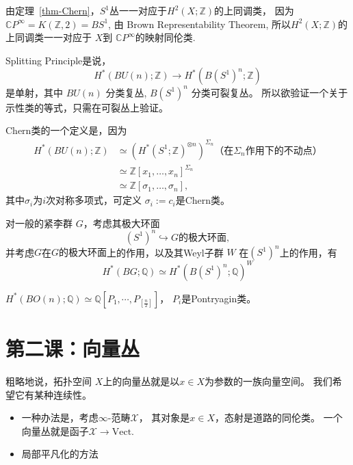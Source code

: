 \begin{example}
    由定理~\ref{thm-Chern}，$S^1$丛一一对应于$H^2(X;\mathbb{Z})$的上同调类，
    因为 $\mathbb{C}P^\infty=K(\mathbb{Z},2)=BS^1$, 由 Brown Representability Theorem, 
    所以$H^2(X;\mathbb{Z})$的上同调类一一对应于 $X$到 $\mathbb{C}P^\infty$的映射同伦类.

    Splitting Principle是说，
    $$
        H^*(BU(n);\mathbb{Z})\rightarrow H^*(B(S^1)^n;\mathbb{Z})
    $$
    是单射，其中 $BU(n)$ 分类复丛, $B(S^1)^n$ 分类可裂复丛。
    所以欲验证一个关于示性类的等式，只需在可裂丛上验证。

    \qquad Chern类的一个定义是，因为
    $$
        \begin{aligned}
            H^{*}(BU(n);\mathbb{Z}) & \simeq \left( H^*(S^1;\mathbb{Z})^{\otimes n} \right)^{\Sigma_n}
             \text{（在}\Sigma_n\text{作用下的不动点）}\\
            & \simeq \mathbb{Z}[x_1,\ldots , x_n]^{\Sigma_n} \\
            & \simeq \mathbb{Z}[\sigma_1,\ldots , \sigma_n],
        \end{aligned}
    $$
    其中$\sigma_i$为$i$次对称多项式，可定义 $\sigma_i:=c_i$是Chern类。

    \qquad 对一般的紧李群 $G$，考虑其极大环面
    $$
        (S^1)^n\hookrightarrow G\text{的极大环面},
    $$
    并考虑$G$在$G\text{的极大环面}$上的作用，以及其Weyl子群 $W$ 在$(S^1)^n$上的作用，有
    $$
        H^*(BG;\mathbb{Q})\simeq H^*(B(S^1)^n;\mathbb{Q})^{W}
    $$
\end{example}

\begin{example}
    $H^*(BO(n);\mathbb{Q})\simeq \mathbb{Q}[P_1,\cdots,P_{[\frac{n}{2}]}]$，
    $P_i$是Pontryagin类。
\end{example}

\section{第二课：向量丛}
    \qquad 粗略地说，拓扑空间 $X$上的向量丛就是以$x\in X$为参数的一族向量空间。
    我们希望它有某种连续性。
    \begin{itemize}
        \item 一种办法是，考虑$\infty$-范畴$\mathscr{X}$，
        其对象是$x\in X$，态射是道路的同伦类。
        一个向量丛就是函子$\mathscr{X}\rightarrow \mathrm{Vect}$.
        \item 局部平凡化的方法
    \end{itemize}
    
